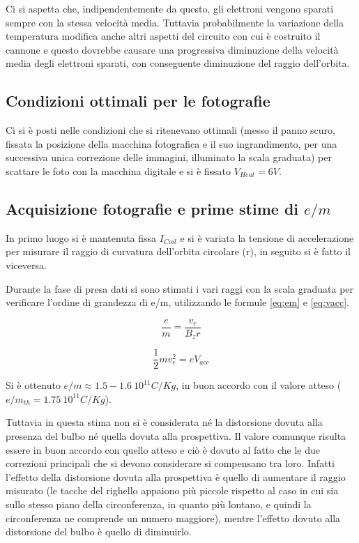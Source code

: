 \documentclass[10pt,a4paper]{article}
\begin{document}
Ci si aspetta che, indipendentemente da questo, gli elettroni vengono sparati sempre con la stessa velocità media. Tuttavia probabilmente la variazione della temperatura modifica anche altri aspetti del circuito con cui è costruito il cannone e questo dovrebbe causare una progressiva diminuzione della velocità media degli elettroni sparati, con conseguente diminuzione del raggio dell'orbita.


\subsection{Condizioni ottimali per le fotografie}

Ci si è posti nelle condizioni che si ritenevano ottimali (messo il panno scuro, fissata la posizione della macchina fotografica e il suo ingrandimento, per una successiva unica correzione delle immagini, illuminato la scala graduata) per scattare le foto con la macchina digitale e si è fissato $V_{Heat} = \unit{6}{V}$.


\subsection{Acquisizione fotografie e prime stime di $e/m$}

In primo luogo si è mantenuta fissa $I_{Coil}$ e si è variata la tensione di accelerazione per misurare il raggio di curvatura dell'orbita circolare (r), in seguito si è fatto il viceversa.

Durante la fase di presa dati si sono stimati i vari raggi con la scala graduata per verificare l'ordine di grandezza di e/m, utilizzando le formule \eqref{eq:em} e \eqref{eq:vacc}. 

\begin{equation}
	\frac{e}{m} = \frac{v_e}{B_z r}
	\label{eq:em}
\end{equation}

\begin{equation}
\frac{1}{2} m v_e^2 = e V_{acc}
\label{eq:vacc}
\end{equation}

Si è ottenuto  $e/m \approx \unit{1.5-1.6~10^{11}}{C/Kg}$, in buon accordo con il valore atteso ($e/m_{th} = \unit{1.75~10^{11}}{C/Kg}$).

Tuttavia in questa stima non si è considerata né la distorsione dovuta alla presenza del bulbo né quella dovuta alla prospettiva. Il valore comunque risulta essere in buon accordo con quello atteso e ciò è dovuto al fatto che le due correzioni principali che si devono considerare si compensano tra loro. Infatti l'effetto della distorsione dovuta alla prospettiva è quello di aumentare il raggio misurato (le tacche del righello appaiono più piccole rispetto al caso in cui sia sullo stesso piano della circonferenza, in quanto più lontano, e quindi la circonferenza ne comprende un numero maggiore), mentre l'effetto dovuto alla distorsione del bulbo è quello di diminuirlo.
\end{document}
